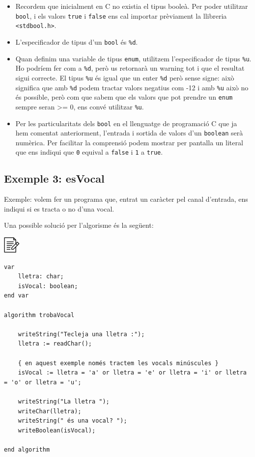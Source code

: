 \documentclass[]{book}
\providecommand{\tightlist}{%
  \setlength{\itemsep}{0pt}\setlength{\parskip}{0pt}}
\begin{document}
\begin{itemize}
\tightlist
\item
  Recordem que inicialment en C no existia el tipus booleà. Per poder utilitzar \texttt{bool}, i els valors \texttt{true} i \texttt{false} ens cal importar prèviament la llibreria \texttt{\textless{}stdbool.h\textgreater{}}.
\item
  L'especificador de tipus d'un \texttt{bool} és \texttt{\%d}.
\item
  Quan definim una variable de tipus \texttt{enum}, utilitzem l'especificador de tipus \texttt{\%u}. Ho podríem fer com a \texttt{\%d}, però us retornarà un warning tot i que el resultat sigui correcte. El tipus \texttt{\%u} és igual que un enter \texttt{\%d} però sense signe: això significa que amb \texttt{\%d} podem tractar valors negatius com -12 i amb \texttt{\%u} això no és possible, però com que sabem que els valors que pot prendre un \texttt{enum} sempre seran \textgreater= 0, ens convé utilitzar \texttt{\%u}.
\item
  Per les particularitats dels \texttt{bool} en el llenguatge de programació C que ja hem comentat anteriorment, l'entrada i sortida de valors d'un \texttt{boolean} serà numèrica. Per facilitar la comprensió podem mostrar per pantalla un literal que ens indiqui que \texttt{0} equival a \texttt{false} i \texttt{1} a \texttt{true}.
\end{itemize}

\hypertarget{exemple-3-esvocal}{%
\subsection{Exemple 3: esVocal}\label{exemple-3-esvocal}}

Exemple: volem fer un programa que, entrat un caràcter pel canal d'entrada, ens indiqui si es tracta o no d'una vocal.

Una possible solució per l'algorisme és la següent:

\includegraphics{./img/alg.png}

\begin{verbatim}
var
    lletra: char;
    isVocal: boolean;
end var

algorithm trobaVocal

    writeString("Tecleja una lletra :");
    lletra := readChar();

    { en aquest exemple només tractem les vocals minúscules }
    isVocal := lletra = 'a' or lletra = 'e' or lletra = 'i' or lletra = 'o' or lletra = 'u';

    writeString("La lletra ");
    writeChar(lletra);
    writeString(" és una vocal? ");
    writeBoolean(isVocal);

end algorithm
\end{verbatim}
\end{document}
